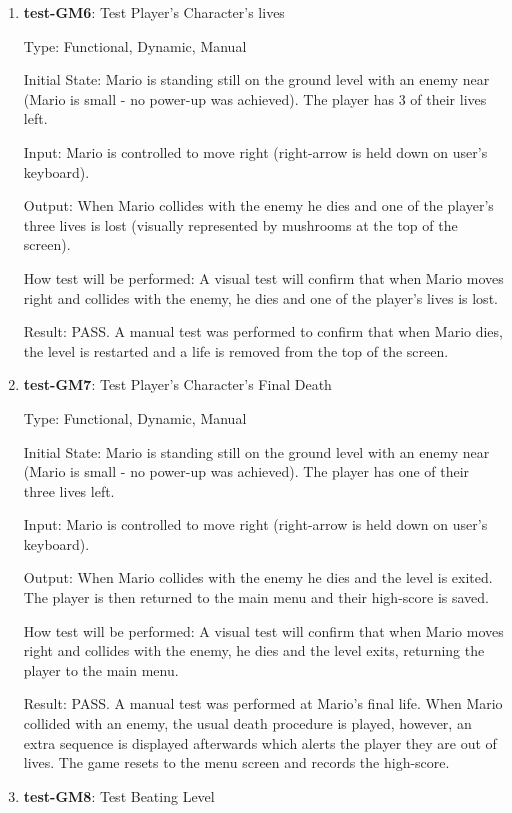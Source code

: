 \documentclass[12pt, titlepage]{article}
\begin{document}
\begin{enumerate}
\item{\textbf{test-GM6}: Test Player's Character's lives\\}

Type: Functional, Dynamic, Manual

Initial State: Mario is standing still on the ground level with an enemy near (Mario is small - no power-up was achieved). The player has 3 of their lives left.
					
Input: Mario is controlled to move right (right-arrow is held down on user's keyboard).
					
Output: When Mario collides with the enemy he dies and one of the player's three lives is lost (visually represented by mushrooms at the top of the screen).
					
How test will be performed: A visual test will confirm that when Mario moves right and collides with the enemy, he dies and one of the player's lives is lost.

Result: PASS. A manual test was performed to confirm that when Mario dies, the level is restarted and a life is removed from the top of the screen.

\item{\textbf{test-GM7}: Test Player's Character's Final Death\\}

Type: Functional, Dynamic, Manual

Initial State: Mario is standing still on the ground level with an enemy near (Mario is small - no power-up was achieved). The player has one of their three lives left.
					
Input: Mario is controlled to move right (right-arrow is held down on user's keyboard).
					
Output: When Mario collides with the enemy he dies and the level is exited. The player is then returned to the main menu and their high-score is saved.
					
How test will be performed: A visual test will confirm that when Mario moves right and collides with the enemy, he dies and the level exits, returning the player to the main menu.

Result: PASS. A manual test was performed at Mario's final life. When Mario collided with an enemy, the usual death procedure is played, however, an extra sequence is displayed afterwards which alerts the player they are out of lives. The game resets to the menu screen and records the high-score.

\item{\textbf{test-GM8}: Test Beating Level\\}


\end{enumerate}
\end{document}
